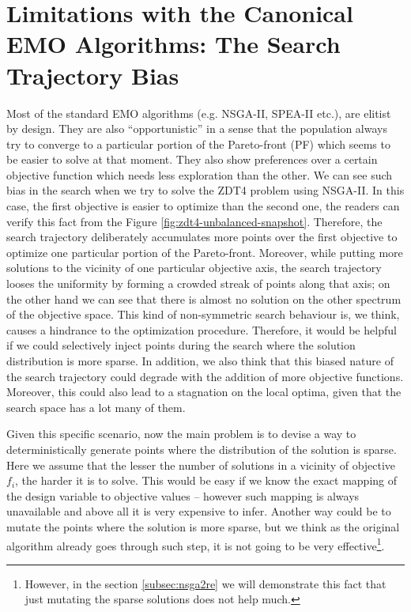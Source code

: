 \documentclass{sig-alternate-05-2015}
\begin{document}
\section{Limitations with the Canonical EMO Algorithms: The Search Trajectory Bias}
\label{sec:limitation-canonical}
Most of the standard EMO algorithms (e.g. NSGA-II, SPEA-II \cite{spea2-main} etc.), are elitist by design. They are also ``opportunistic'' in a sense that the population always try to converge to a particular portion of the Pareto-front (PF) which seems to be easier to solve at that moment. They also show preferences over a certain objective function which needs less exploration than the other. We can see such bias in the search when we try to solve the ZDT4 problem using NSGA-II. In this case, the first objective is easier to optimize than the second one, the readers can verify this fact from the Figure \ref{fig:zdt4-unbalanced-snapshot}. Therefore, the search trajectory deliberately accumulates more points over the first objective to optimize one particular portion of the Pareto-front. Moreover, while putting more solutions to the vicinity of one particular objective axis, the search trajectory looses the uniformity by forming a crowded streak of points along that axis; on the other hand we can see that there is almost no solution on the other spectrum of the objective space. This kind of non-symmetric search behaviour is, we think, causes a hindrance to the optimization procedure. Therefore, it would be helpful if we could selectively inject points during the search where the solution distribution is more sparse. In addition, we also think that this biased nature of the search trajectory could degrade with the addition of more objective functions. Moreover, this could also lead to a stagnation on the local optima, given that the search space has a lot many of them.

Given this specific scenario, now the main problem is to devise a way to deterministically generate points where the distribution of the solution is sparse. Here we assume that the lesser the number of solutions in a vicinity of objective \(f_i\), the harder it is to solve. This would be easy if we know the exact mapping of the design variable to objective values -- however such mapping is always unavailable and above all it is very expensive to infer. Another way could be to mutate the points where the solution is more sparse, but we think as the original algorithm already goes through such step, it is not going to be very effective\footnote{However, in the section \ref{subsec:nsga2re} we will demonstrate this fact that just mutating the sparse solutions does not help much.}. 
\end{document}
